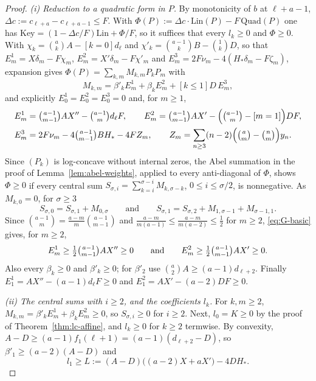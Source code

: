 \begin{proof}
\emph{(i) Reduction to a quadratic form in $P$.} By monotonicity of $b$ at $\ell+a-1$, $\Delta c:=c_{\ell+a}-c_{\ell+a-1}\leq F$. With $\Phi(P):=\Delta c\cdot\mathrm{Lin}(P)-F\,\mathrm{Quad}(P)$ one has $\mathrm{Key}=(1-\Delta c/F)\mathrm{Lin}+\Phi/F$, so it suffices that every $l_k\geq0$ and $\Phi\geq0$. With $\chi_k=\binom akA-[k=0]d_\ell$ and $\chi'_k=\binom{a-1}kB-\binom1kD$, so that $E^1_m=X\delta_m-F\chi_m$, $E^2_m=X'\delta_m-F\chi'_m$ and $E^3_m=2F\nu_m-4(H_*\delta_m-F\zeta_m)$, expansion gives $\Phi(P)=\sum_{k,m}M_{k,m}P_kP_m$ with
\[
M_{k,m}=\beta'_kE^1_m+\beta_kE^2_m+[k\leq1]D\,E^3_m,
\]
and explicitly $E^1_0=E^2_0=E^3_0=0$ and, for $m\geq1$,
\[
\begin{aligned}
E^1_m&=\tbinom{a-1}{m-1}AX''-\tbinom{a-1}md_\ell F,\qquad E^2_m=\tbinom{a-1}{m-1}AX'-\Bigl(\tbinom{a-1}m-[m=1]\Bigr)DF,\\
E^3_m&=2F\nu_m-4\tbinom{a-1}{m-1}BH_*-4FZ_m,\qquad Z_m=\sum_{n\geq3}(n-2)\Bigl(\tbinom am-\tbinom nm\Bigr)y_n.
\end{aligned}
\]
Since $(P_k)$ is log-concave without internal zeros, the Abel summation in the proof of Lemma~\ref{lem:abel-weights}, applied to every anti-diagonal of $\Phi$, shows $\Phi\geq0$ if every central sum $S_{\sigma,i}=\sum_{k=i}^{\sigma-i}M_{k,\sigma-k}$, $0\leq i\leq\sigma/2$, is nonnegative. As $M_{k,0}=0$, for $\sigma\geq3$
\[
S_{\sigma,0}=S_{\sigma,1}+M_{0,\sigma}\qquad\text{and}\qquad S_{\sigma,1}=S_{\sigma,2}+M_{1,\sigma-1}+M_{\sigma-1,1}.
\]
Since $\binom{a-1}m=\frac{a-m}m\binom{a-1}{m-1}$ and $\frac{a-m}{m(a-1)}\leq\frac{a-m}{m(a-2)}\leq\frac12$ for $m\geq2$, \eqref{eq:G-basic} gives, for $m\geq2$,
\[
E^1_m\geq\tfrac12\tbinom{a-1}{m-1}AX''\geq0\qquad\text{and}\qquad E^2_m\geq\tfrac12\tbinom{a-1}{m-1}AX'\geq0.
\]
Also every $\beta_k\geq0$ and $\beta'_k\geq0$; for $\beta'_2$ use $\binom a2A\geq(a-1)d_{\ell+2}$. Finally $E^1_1=AX''-(a-1)d_\ell F\geq0$ and $E^2_1=AX'-(a-2)DF\geq0$.

\emph{(ii) The central sums with $i\geq2$, and the coefficients $l_k$.} For $k,m\geq2$, $M_{k,m}=\beta'_kE^1_m+\beta_kE^2_m\geq0$, so $S_{\sigma,i}\geq0$ for $i\geq2$. Next, $l_0=K\geq0$ by the proof of Theorem~\ref{thm:lc-affine}, and $l_k\geq0$ for $k\geq2$ termwise. By convexity, $A-D\geq(a-1)f_1(\ell+1)=(a-1)(d_{\ell+2}-D)$, so $\beta'_1\geq(a-2)(A-D)$ and
\[
l_1\geq L:=(A-D)\bigl((a-2)X+aX'\bigr)-4DH_*.
\]


\end{proof}
